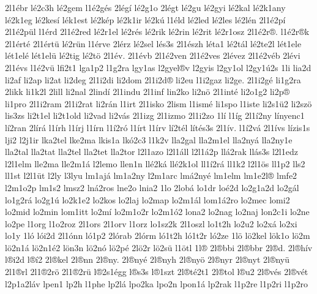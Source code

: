 {2l1^^e9br
l^^e92c3h
l^^e92gem
l1^^e92g^^e9s
2l^^e9g^^ed
l^^e92g1o
2l^^e9gt
l^^e92gu
l^^e92gyi
l^^e92kal
l^^e92k1any
l^^e92k1eg
l^^e92kes^^ed
l^^e9k1est
l^^e92k^^e9p
l^^e92k1ir
l^^e92k^^fa
l1^^e9ld
l^^e92led
l^^e92les
l^^e92l^^e9n
2l1^^e92p^^ed
2l1^^e92p^^fcl
l1^^e9rd
2l1^^e92red
l^^e92r1el
l^^e92r^^e9s
l^^e92rik
l^^e92rin
l^^e92rit
l^^e92r1osz
2l1^^e92r^^ae.
l1^^e92r^^aek
2l1^^e9rt^^e9
2l1^^e9rt^^fc
l^^e92r^^fcn
l1^^e9rve
2l^^e9rz
l^^e92sel
l^^e9s3s
2l1^^e9szh
l^^e9ta1
l^^e92t^^e1l
l^^e92te2l
l^^e9t1ele
l^^e9t1el^^e9
l^^e9t1el^^fc
l^^e92tig
l^^e92t^^f6
2l1^^e9v.
2l1^^e9vb
2l1^^e92ven
2l1^^e92ves
2l^^e9vez
2l1^^e92v^^e9b
2l^^e9vi
2l1^^e9vs
l1^^e92v^^fc
lfi2t1
lga1p2
l1g2ra
lgy1as
l2gyel^^aev
l2gyis
l2gy1ol
l2gy1^^fa2s
1li
lia2d
li2af
li2ap
li2at
li2deg
2l1i2di
li2dom
2l1i2d^^ae
li2eu
l1i2gaz
li2ge.
2l1i2g^^e9
li1g2ra
2likk
li1k2l
2lill
li2nal
2lind^^ed
2l1indu
2l1inf
lin2ko
li2n^^f6
2l1int^^e9
li2o1g2
li2p^^ae
li1pro
2l1i2ram
2l1i2rat
li2r^^e1n
l1irt
2l1isko
2lism
l1ism^^e9
li1spo
l1iste
li2s1^^fc2
li2sz^^f6
lis3zs
li2t1el
li2t1old
li2vad
li2v^^e1s
2l1izg
2l1izmo
2l1i2zo
1l^^ed
l1^^edg
2l1^^ed2ny
l^^ednyenc1
l^^ed2ran
2l^^edr^^e1
l1^^edrh
l1^^edrj
l1^^edrn
l1^^ed2r^^f3
l1^^edrt
l1^^edrv
l^^ed2t^^e9l
l^^edt^^e9s3s
2l1^^edv.
l1^^ed2v^^e1
2l1^^edvs
l^^edzis1s
lji2
l2j1ir
lka2tel
lke2ma
lkis1a
lk^^f32c3
l1k2v
lla2gal
lla2m1el
lla2ny^^e1
lla2ny1e
lla2tal
lla2tat
lla2tel
lla2tet
lla2tor
l2l1azo
l2l1^^e1ll
l2l1^^e12p
ll^^e12rak
ll^^e1s3s
l2l1edz
l2l1elm
lle2ma
lle2m1^^e1
l2lemo
llen1n
ll^^e92k^^e1
ll^^e92k1ol
ll1^^ed2r^^e1
ll1k2
l2l1^^f6s
ll1p2
lls2
ll1st
l2l1^^fct
l2ly
l3lyu
lm1aj^^e1
lm1a2ny
l2m1arc
lm^^e12ny^^e9
lm1elm
lm1e2l^^ae
lmfe2
l2m1o2p
lm1s2
lmsz2
ln^^e12ros
lne2o
lnia2
1lo
2lob^^e1
lo1dr
lo^^e92d
lo2g1a2d
lo2g^^e1l
lo1g2r^^e1
lo2g1^^fa
lo2k1e2
lo2kos
lo2laj
lo2map
lo2m1^^e1l
lom1^^e12ro
lo2mec
lomi2
lo2mid
lo2min
lom1itt
lo2m^^ed
lo2m1o2r
lo2m1^^f32
lona2
lo2nag
lo2naj
lon2c1i
lo2ne
lo2pe
l1org
l1o2roz
2l1ors
2l1orv
l1orz
lo1sz2k
2l1oszl
lo1t2h
lo2u2
lo2x^^e1
lo2xi
lo1y
1l^^f3
l^^f3i2d
2l1^^f3nn
l^^f31p2
2l^^f3rab
2l^^f3rm
l^^f31t2h
l^^f31t2r
l^^f32ze
1l^^f6
l^^f62kel
l^^f6k1o
l^^f62m
l^^f62n1^^e1
l^^f62n1^^e92
l^^f6n3n
l^^f62n^^f3
l^^f62p^^e9
2l^^f62r
l^^f62s^^fc
l1^^f6tl
1l^^ae
2l^^aebbi
2l^^aebbr
2l^^aed.
2l^^aeh^^edv
l^^aei2d
l^^ae^^ed2
2l^^aekel
2l^^aenn
2l^^aeny.
2l^^aeny^^e9
2l^^aenyh
2l^^aeny^^f6
2l^^aenyr
2l^^aenyt
2l^^aeny^^fc
2l1^^aerl
2l1^^ae2r^^f6
2l1^^ae2r^^fc
l^^ae2s1^^e9gg
l^^aes3s
l^^ae1szt
2l^^aet^^e92t1
2l^^aetol
l^^aeu2
2l^^aev^^e9s
2l^^aev^^e9t
l2p1a2l^^e1v
lpen1
lp2h
l1phe
lp2l^^e1
lpo2ka
lpo2n
lpon1^^e1
lp2rak
l1p2re
l1p2ri
l1p2ro
}
